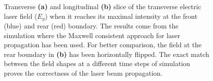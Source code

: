 \begin{figure}[h!]
	\centering
	\hspace{1mm}
	\caption{Transverse \textbf{(a)} and longitudinal \textbf{(b)} slice of the transverse electric laser field ($ E_{y} $) when it reaches its maximal intensity at the front (blue) and rear (red) boundary. The results come from the simulation where the Maxwell consistent approach for laser propagation has been used. For better comparison, the field at the rear boundary in \textbf{(b)} has been horizontally flipped. The exact match between the field shapes at a different time steps of simulation proves the correctness of the laser beam propagation.}
	\label{fig:4}
\end{figure}

